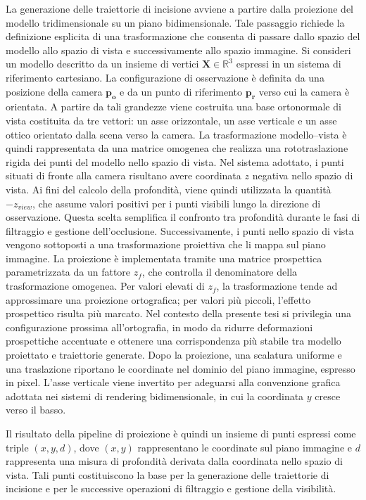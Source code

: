 \documentclass[a4paper,11pt,titlepage,twoside]{book}
\newcommand{\1}{\mathbf{1}}
\numberwithin{equation}{chapter}
\theoremstyle{plain}
\theoremstyle{definition}
\begin{document}
	La generazione delle traiettorie di incisione avviene a partire dalla proiezione del modello tridimensionale su un piano bidimensionale. Tale passaggio richiede la definizione esplicita di una trasformazione che consenta di passare dallo spazio del modello allo spazio di vista e successivamente allo spazio immagine\cite{Foley1996}.
	Si consideri un modello descritto da un insieme di vertici $\mathbf{X} \in \mathbb{R}^3$ espressi in un sistema di riferimento cartesiano. La configurazione di osservazione è definita da una posizione della camera $\mathbf{p_o}$ e da un punto di riferimento $\mathbf{p_r}$ verso cui la camera è orientata. A partire da tali grandezze viene costruita una base ortonormale di vista costituita da tre vettori: un asse orizzontale, un asse verticale e un asse ottico orientato dalla scena verso la camera. La trasformazione modello–vista è quindi rappresentata da una matrice omogenea che realizza una rototraslazione rigida dei punti del modello nello spazio di vista.
	Nel sistema adottato, i punti situati di fronte alla camera risultano avere coordinata $z$ negativa nello spazio di vista. Ai fini del calcolo della profondità, viene quindi utilizzata la quantità $-z_{view}$, che assume valori positivi per i punti visibili lungo la direzione di osservazione. Questa scelta semplifica il confronto tra profondità durante le fasi di filtraggio e gestione dell’occlusione.
	Successivamente, i punti nello spazio di vista vengono sottoposti a una trasformazione proiettiva che li mappa sul piano immagine. La proiezione è implementata tramite una matrice prospettica parametrizzata da un fattore $z_f$, che controlla il denominatore della trasformazione omogenea. Per valori elevati di $z_f$, la trasformazione tende ad approssimare una proiezione ortografica; per valori più piccoli, l’effetto prospettico risulta più marcato. Nel contesto della presente tesi si privilegia una configurazione prossima all’ortografia, in modo da ridurre deformazioni prospettiche accentuate e ottenere una corrispondenza più stabile tra modello proiettato e traiettorie generate.
	Dopo la proiezione, una scalatura uniforme e una traslazione riportano le coordinate nel dominio del piano immagine, espresso in pixel. L’asse verticale viene invertito per adeguarsi alla convenzione grafica adottata nei sistemi di rendering bidimensionale, in cui la coordinata $y$ cresce verso il basso.
	
	Il risultato della pipeline di proiezione è quindi un insieme di punti espressi come triple $(x, y, d)$, dove $(x, y)$ rappresentano le coordinate sul piano immagine e $d$ rappresenta una misura di profondità derivata dalla coordinata nello spazio di vista. Tali punti costituiscono la base per la generazione delle traiettorie di incisione e per le successive operazioni di filtraggio e gestione della visibilità.
	
\end{document}
